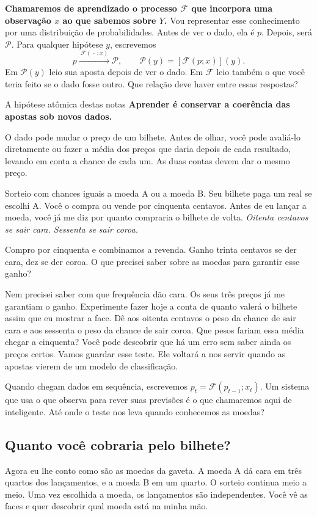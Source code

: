 \documentclass[12pt,oneside]{article}
\newcommand{\secao}[1]{\Needspace{5.2\baselineskip}\subsection*{#1}}
\newcommand{\bookanchor}[1]{\phantomsection\label{#1}}
\begin{document}
\textbf{Chamaremos\bookanchor{topic-01-1} de aprendizado o processo \(\mathcal F\) que incorpora uma observação \(x\) ao que sabemos sobre \(Y\).} Vou representar esse conhecimento por uma distribuição de probabilidades. Antes de ver o dado, ela é \(p\). Depois, será \(\mathcal P\). Para qualquer hipótese \(y\), escrevemos
\[
 p \xrightarrow{\ \mathcal F(\,\cdot\,;x)\ } \mathcal P,
 \qquad \mathcal P(y)=[\mathcal F(p;x)](y).
\]
Em $\mathcal P(y)$ leio sua aposta depois de ver o dado. Em $\mathcal F$ leio também o que você teria feito se o dado fosse outro. Que relação deve haver entre essas respostas?

\begin{quadro}{A hipótese atômica destas notas}
\textbf{Aprender\bookanchor{topic-01-2} é conservar a coerência das apostas sob novos dados.}

O dado pode mudar o preço de um bilhete. Antes de olhar, você pode avaliá-lo diretamente ou fazer a média dos preços que daria depois de cada resultado, levando em conta a chance de cada um. As duas contas devem dar o mesmo preço.
\end{quadro}

Sorteio com chances iguais a moeda A ou a moeda B. Seu bilhete paga um real se escolhi A. Você o compra ou vende por cinquenta centavos. Antes de eu lançar a moeda, você já me diz por quanto compraria o bilhete de volta. \emph{Oitenta centavos se sair cara. Sessenta se sair coroa.}

Compro por cinquenta e combinamos a revenda. Ganho trinta centavos se der cara, dez se der coroa. O que precisei saber sobre as moedas para garantir esse ganho?

Nem precisei saber com que frequência dão cara. Os seus três preços já me garantiam o ganho. Experimente fazer hoje a conta de quanto valerá o bilhete assim que eu mostrar a face. Dê aos oitenta centavos o peso da chance de sair cara e aos sessenta o peso da chance de sair coroa. Que pesos fariam essa média chegar a cinquenta? Você pode descobrir que há um erro sem saber ainda os preços certos. Vamos guardar esse teste. Ele voltará a nos servir quando as apostas vierem de um modelo de classificação.

Quando chegam dados em sequência, escrevemos $p_t=\mathcal F(p_{t-1};x_t)$. Um sistema que usa o que observa para rever suas previsões é o que chamaremos aqui de inteligente. Até onde o teste nos leva quando conhecemos as moedas?

\secao{Quanto você cobraria pelo bilhete?}
Agora eu lhe conto como são as moedas da gaveta. A moeda A dá cara em três quartos dos lançamentos, e a moeda B em um quarto. O sorteio continua meio a meio. Uma vez escolhida a moeda, os lançamentos são independentes. Você vê as faces e quer descobrir qual moeda está na minha mão.
\end{document}
